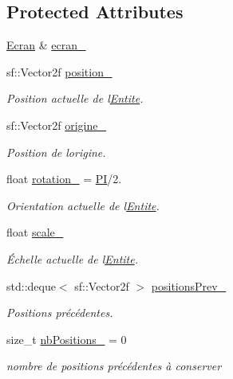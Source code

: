\subsection*{Protected Attributes}
\begin{DoxyCompactItemize}
\item 
\mbox{\hyperlink{class_ecran}{Ecran}} \& \mbox{\hyperlink{class_entite_a45a5a3f7a0f4690aa0d075ba2af172a3}{ecran\+\_\+}}
\item 
sf\+::\+Vector2f \mbox{\hyperlink{class_entite_abbd554c4f122159a73cb113cc8de3860}{position\+\_\+}}
\begin{DoxyCompactList}\small\item\em Position actuelle de l\textquotesingle{}\mbox{\hyperlink{class_entite}{Entite}}. \end{DoxyCompactList}\item 
sf\+::\+Vector2f \mbox{\hyperlink{class_entite_ac3986b76d5eb35e9c9ec1f51bf516987}{origine\+\_\+}}
\begin{DoxyCompactList}\small\item\em Position de l\textquotesingle{}origine. \end{DoxyCompactList}\item 
float \mbox{\hyperlink{class_entite_a8b1e07858f2f6090b19765d9a7f723fe}{rotation\+\_\+}} = \mbox{\hyperlink{_collision_8cpp_a952eac791b596a61bba0a133a3bb439f}{PI}}/2.
\begin{DoxyCompactList}\small\item\em Orientation actuelle de l\textquotesingle{}\mbox{\hyperlink{class_entite}{Entite}}. \end{DoxyCompactList}\item 
float \mbox{\hyperlink{class_entite_a50e0f8c1188d9833432c55c7f7d2aa0f}{scale\+\_\+}}
\begin{DoxyCompactList}\small\item\em Échelle actuelle de l\textquotesingle{}\mbox{\hyperlink{class_entite}{Entite}}. \end{DoxyCompactList}\item 
std\+::deque$<$ sf\+::\+Vector2f $>$ \mbox{\hyperlink{class_entite_a917f4b325c90fea530786637935eb1b5}{positions\+Prev\+\_\+}}
\begin{DoxyCompactList}\small\item\em Positions précédentes. \end{DoxyCompactList}\item 
size\+\_\+t \mbox{\hyperlink{class_entite_a737d76cd7a3de46a5d72231ef974f8d1}{nb\+Positions\+\_\+}} = 0
\begin{DoxyCompactList}\small\item\em nombre de positions précédentes à conserver \end{DoxyCompactList}\item 

\end{DoxyCompactItemize}
